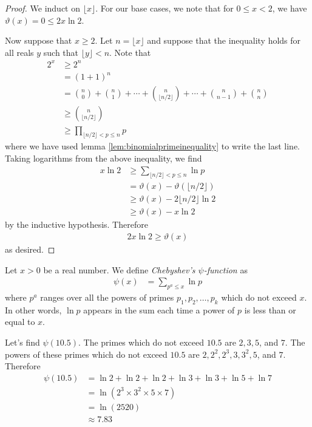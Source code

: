 	\begin{proof}
		We induct on $\lfloor x \rfloor$. For our base cases, we note that for $0 \le x < 2$, we have $\vartheta(x) = 0 \leq 2x \ln 2$.

		Now suppose that $x \geq 2$. Let $n = \lfloor x \rfloor$ and suppose that the inequality holds for all reals $y$ such that $\lfloor y \rfloor <n$. Note that
			\begin{align*}
				2^x
					& \geq 2^n\\
					& = (1+1)^n\\
					& = \binom{n}{0} + \binom{n}{1} + \cdots + \binom{n}{\lfloor n/2 \rfloor} + \cdots + \binom{n}{n-1}+\binom{n}{n}\\
					& \geq \binom{n}{\lfloor n/2 \rfloor}\\
					& \geq \prod_{\lfloor n/2 \rfloor < p \leq n} p
			\end{align*}
		where we have used lemma \eqref{lem:binomialprimeinequality} to write the last line. Taking logarithms from the above inequality, we find
			\begin{align*}
				x \ln 2 &\geq \sum_{\lfloor n/2 \rfloor < p \le n} \ln p \\
						 &= \vartheta(x) - \vartheta(\lfloor n/2 \rfloor) \\
						 &\geq \vartheta(x) - 2\lfloor n/2 \rfloor \ln 2 \\
						 &\geq \vartheta(x) - x \ln 2
			\end{align*}
		by the inductive hypothesis. Therefore
			\begin{align*}
				2x \ln 2 \ge \vartheta(x)
			\end{align*}
		as desired.
	\end{proof}

	\begin{definition}
		Let $x>0$ be a real number. We define \textit{Chebyshev's $\psi$-function} as
			\begin{align*}
				\psi(x)
					& = \sum_{p^a \leq x} \ln p
			\end{align*}
		where $p^a$ ranges over all the powers of primes $p_1, p_2, \ldots, p_k$ which do not exceed $x$. In other words, $\ln p$ appears in the sum each time a power of $p$ is less than or equal to $x$.
	\end{definition}

	\begin{example}
		Let's find $\psi(10.5)$. The primes which do not exceed $10.5$ are $2,3,5$, and $7$. The powers of these primes which do not exceed $10.5$ are $2, 2^2, 2^3, 3, 3^2, 5$, and $7$. Therefore
			\begin{align*}
				\psi(10.5) &= \ln 2 + \ln 2 + \ln 2 +\ln 3 + \ln 3+ \ln 5 + \ln 7\\
						   &= \ln(2^3 \times  3^2 \times 5 \times 7)\\
						   &=\ln(2520)\\
						   &\approx 7.83
			\end{align*}
	\end{example}

